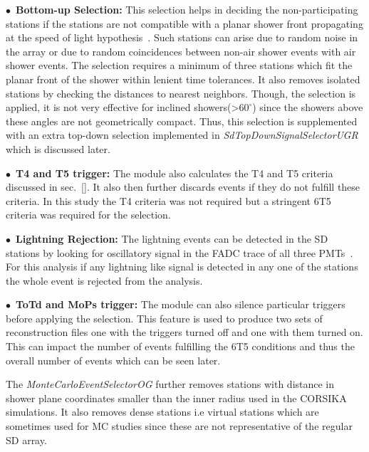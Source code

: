 \begin{description}
  \item $\bullet$~\textbf{Bottom-up Selection:} This selection helps in deciding the non-participating stations if the stations are not compatible with a planar shower front propagating at the speed of light hypothesis~\cite{}. Such stations can arise due to random noise in the array or due to random coincidences between non-air shower events with air shower events. The selection requires a minimum of three stations which fit the planar front of the shower within lenient time tolerances. It also removes isolated stations by checking the distances to nearest neighbors. Though, the selection is applied, it is not very effective for inclined showers(>$60^{\circ}$) since the showers above these angles are not geometrically compact. Thus, this selection is supplemented with an extra top-down selection implemented in \textit{SdTopDownSignalSelectorUGR} which is discussed later. 
  \item $\bullet$~\textbf{T4 and T5 trigger:} The module also calculates the T4 and T5 criteria discussed in sec.~\ref{}. It also then further discards events if they do not fulfill these criteria. In this study the T4 criteria was not required but a stringent 6T5 criteria was required for the selection. 
  \item $\bullet$~\textbf{Lightning Rejection:} The lightning events can be detected in the SD stations by looking for oscillatory signal in the FADC trace of all three PMTs~\cite{}. For this analysis if any lightning like signal is detected in any one of the stations the whole event is rejected from the analysis. 
  \item $\bullet$~\textbf{ToTd and MoPs trigger:} The module can also silence particular triggers before applying the selection. This feature is used to produce two sets of reconstruction files one with the triggers turned off and one with them turned on. This can impact the number of events fulfilling the 6T5 conditions and thus the overall number of events which can be seen later.    
\end{description}

The \textit{MonteCarloEventSelectorOG} further removes stations with distance in shower plane coordinates smaller than the inner radius used in the CORSIKA simulations. It also removes dense stations i.e virtual stations which are sometimes used for MC studies since these are not representative of the regular SD array. 

